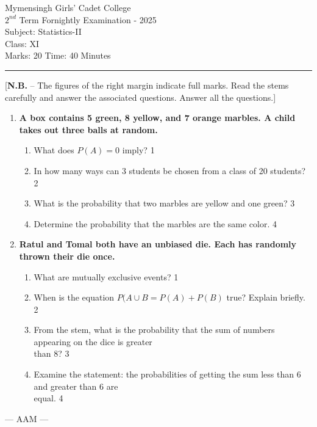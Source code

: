 \documentclass[12pt]{article}
\begin{document}
\begin{center}
Mymensingh Girls' Cadet College \\
$2^{nd}$ Term Fornightly Examination - 2025 \\
Subject: Statistics-II \\
Class: XI \\
Marks: 20 \hfill Time: 40 Minutes
\end{center}



\hrule


\begin{center}
[\textbf{N.B.} – The figures of the right margin indicate full marks. Read 
the stems carefully and answer the associated questions. Answer all the questions.]\\
\end{center}


  \begin{enumerate}

   \item
	  \textbf{A box contains 5 green, 8 yellow, and 7 orange marbles. A child takes out three balls at random.} 
  
  \begin{enumerate}
  \item What does $P(A) = 0$ imply? \hfill 1
  \item
In how many ways can 3 students be chosen from a class of 20 students? \hfill 2
    \item  
	What is the probability that two marbles are yellow and one green? \hfill 3
    \item
	Determine the probability that the marbles are the same color. \hfill 4
  \end{enumerate}
  
         \item
	  \textbf{Ratul and Tomal both have an unbiased die. Each has randomly thrown their die once.} 
  
  \begin{enumerate}
    \item
	What are mutually exclusive events? \hfill 1
	\item When is the equation $P(A \cup B = P(A) + P(B)$ true? Explain briefly. \hfill 2
    \item  
	From the stem, what is the probability that the sum of numbers appearing
	 on the dice is greater\\ than 8? \hfill 3
    \item
	Examine the statement: the probabilities of getting the sum less than 6 and greater 
	than 6 are \\ equal. \hfill 4
  \end{enumerate}

\end{enumerate}
\begin{center}
--- AAM ---
\end{center}
  \vspace{1cm}
  
\end{document}
